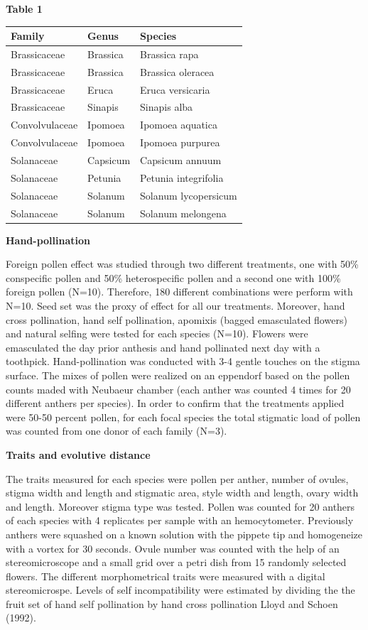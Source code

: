 \documentclass[11pt,a4paper]{article}
\begin{document}
\textbf{Table 1}

\begin{longtable}[]{@{}lll@{}}
\toprule
Family & Genus & Species\tabularnewline
\midrule
\endhead
Brassicaceae & Brassica & Brassica rapa\tabularnewline
Brassicaceae & Brassica & Brassica oleracea\tabularnewline
Brassicaceae & Eruca & Eruca versicaria\tabularnewline
Brassicaceae & Sinapis & Sinapis alba\tabularnewline
Convolvulaceae & Ipomoea & Ipomoea aquatica\tabularnewline
Convolvulaceae & Ipomoea & Ipomoea purpurea\tabularnewline
Solanaceae & Capsicum & Capsicum annuum\tabularnewline
Solanaceae & Petunia & Petunia integrifolia\tabularnewline
Solanaceae & Solanum & Solanum lycopersicum\tabularnewline
Solanaceae & Solanum & Solanum melongena\tabularnewline
\bottomrule
\end{longtable}

\textbf{Hand-pollination}

Foreign pollen effect was studied through two different treatments, one
with 50\% conspecific pollen and 50\% heterospecific pollen and a second
one with 100\% foreign pollen (N=10). Therefore, 180 different
combinations were perform with N=10. Seed set was the proxy of effect
for all our treatments. Moreover, hand cross pollination, hand self
pollination, apomixis (bagged emasculated flowers) and natural selfing
were tested for each species (N=10). Flowers were emasculated the day
prior anthesis and hand pollinated next day with a toothpick.
Hand-pollination was conducted with 3-4 gentle touches on the stigma
surface. The mixes of pollen were realized on an eppendorf based on the
pollen counts maded with Neubaeur chamber (each anther was counted 4
times for 20 different anthers per species). In order to confirm that
the treatments applied were 50-50 percent pollen, for each focal species
the total stigmatic load of pollen was counted from one donor of each
family (N=3).

\textbf{Traits and evolutive distance}

The traits measured for each species were pollen per anther, number of
ovules, stigma width and length and stigmatic area, style width and
length, ovary width and length. Moreover stigma type was tested. Pollen
was counted for 20 anthers of each species with 4 replicates per sample
with an hemocytometer. Previously anthers were squashed on a known
solution with the pippete tip and homogeneize with a vortex for 30
seconds. Ovule number was counted with the help of an stereomicroscope
and a small grid over a petri dish from 15 randomly selected flowers.
The different morphometrical traits were measured with a digital
stereomicrospe. Levels of self incompatibility were estimated by
dividing the the fruit set of hand self pollination by hand cross
pollination Lloyd and Schoen (1992).
\end{document}
